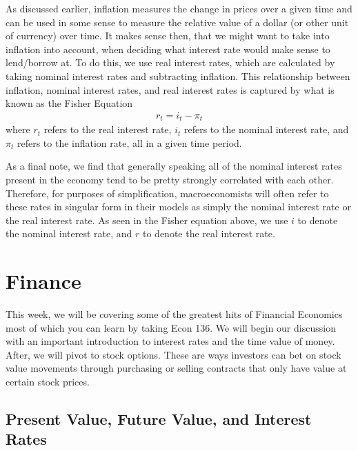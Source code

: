 \documentclass[letterpaper,10pt,english]{jupyterBook}
\begin{document}
\sphinxAtStartPar
As discussed earlier, inflation measures the change in prices over a given time and can be used in some sense to measure the relative value of a dollar (or other unit of currency) over time. It makes sense then, that we might want to take into inflation into account, when deciding what interest rate would make sense to lend/borrow at. To do this, we use real interest rates, which are calculated by taking nominal interest rates and subtracting inflation. This relationship between inflation, nominal interest rates, and real interest rates is captured by what is known as the Fisher Equation
\begin{equation*}
\begin{split} r_t = i_t - \pi_t \end{split}
\end{equation*}
\sphinxAtStartPar
where \(r_t\) refers to the real interest rate, \(i_t\) refers to the nominal interest rate, and \(\pi_t\) refers to the inflation rate, all in a given time period.

\sphinxAtStartPar
As a final note, we find that generally speaking all of the nominal interest rates present in the economy tend to be pretty strongly correlated with each other. Therefore, for purposes of simplification, macroeconomists will often refer to these rates in singular form in their models as simply the nominal interest rate or the real interest rate. As seen in the Fisher equation above, we use \(i\) to denote the nominal interest rate, and \(r\) to denote the real interest rate.


\section{Finance}
\label{\detokenize{content/10-finance/index:finance}}\label{\detokenize{content/10-finance/index::doc}}
\sphinxAtStartPar
This week, we will be covering some of the greatest hits of Financial Economics \sphinxhyphen{} most of which you can learn by taking Econ 136. We will begin our discussion with an important introduction to interest rates and the time value of money. After, we will pivot to stock options. These are ways investors can bet on stock value movements through purchasing or selling contracts that only have value at certain stock prices.


\subsection{Present Value, Future Value, and Interest Rates}
\label{\detokenize{content/10-finance/value-interest:present-value-future-value-and-interest-rates}}\label{\detokenize{content/10-finance/value-interest::doc}}
\end{document}
